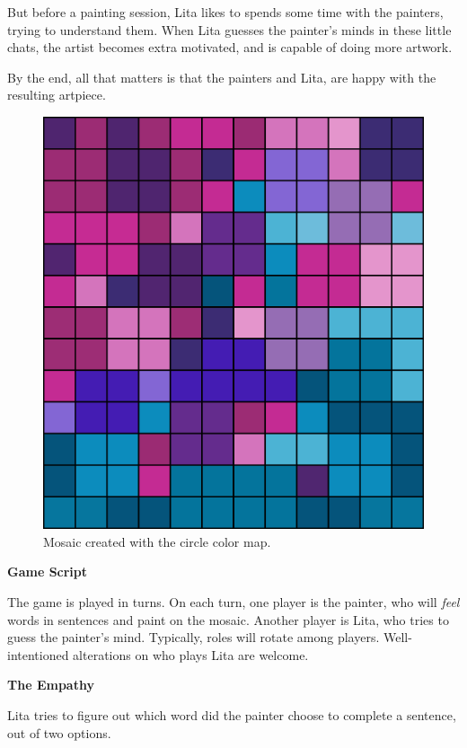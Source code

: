 \documentclass[twocolumn]{article}
\newcommand{\lvl}[1]{\vspace{0.5cm}\Large{\textbf{#1}}\vspace{0.2cm}}
\begin{document}
But before a painting session, Lita likes to spends some time with the painters, trying to understand them. When Lita guesses the painter's minds in these little chats, the artist becomes extra motivated, and is capable of doing more artwork. 

By the end, all that matters is that the painters and Lita, are happy with the resulting artpiece.

\newpage

\begin{figure}[t!]
\centering
\includegraphics[scale=0.2]{sario210222.png}
\caption{Mosaic created with the circle color map.}
\label{fig:mosaic_2}
\end{figure}


\lvl{Game Script}

The game is played in turns. On each turn, one player is the painter, who will \textit{feel} words in sentences and paint on the mosaic. Another player is Lita, who tries to guess the painter's mind. Typically, roles will rotate among players. Well-intentioned alterations on who plays Lita are welcome. 

\lvl{The Empathy}

Lita tries to figure out which word did the painter choose to complete a sentence, out of two options.
\end{document}
